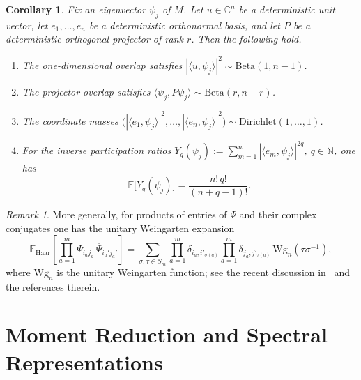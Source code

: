 \documentclass[11pt,a4paper]{article}
\newtheorem{corollary}[theorem]{Corollary}
\theoremstyle{definition}\newtheorem{definition}[theorem]{Definition}
\theoremstyle{remark}\newtheorem{remark}[theorem]{Remark}
\numberwithin{equation}{section}
\newcommand{\C}{\mathbb{C}}
\newcommand{\EE}{\mathbb{E}}
\begin{document}
\begin{corollary} 
Fix an
eigenvector $\psi_j$ of $M$. Let $u\in\C^n$ be a deterministic unit vector, let
$e_1,\dots,e_n$ be a deterministic orthonormal basis, and let $P$ be a
deterministic orthogonal projector of rank $r$. Then the following hold.

\begin{enumerate}
\item The one-dimensional overlap satisfies $|\langle u,\psi_j\rangle|^2 \sim \mathrm{Beta}(1,n-1)$.

\item The projector overlap satisfies $\langle \psi_j,P\psi_j\rangle \sim \mathrm{Beta}(r,n-r)$.

\item The coordinate masses
$\bigl(|\langle e_1,\psi_j\rangle|^2,\dots,|\langle e_n,\psi_j\rangle|^2\bigr) 
\sim \mathrm{Dirichlet}(1,\dots,1)$.

\item For the inverse participation ratios $ Y_q(\psi_j):=\sum_{m=1}^n |\langle e_m,\psi_j\rangle|^{2q}$,
  $ q\in\mathbb N$, one has
\begin{equation}
\EE\big[Y_q(\psi_j)\big]
=
\frac{n!\,q!}{(n+q-1)!}.
\end{equation}
\end{enumerate}
\end{corollary}
 

\begin{remark} 
More generally, for products of entries of $\Psi$ and their complex conjugates one
has the unitary Weingarten expansion
\begin{equation}
\EE_{\mathrm{Haar}}\!\left[\prod_{a=1}^{m}\Psi_{i_a j_a}\,\overline{\Psi}_{i_a' j_a'}\right]
=
\sum_{\sigma,\tau\in S_m}
\prod_{a=1}^{m}\delta_{i_a,i'_{\sigma(a)}}
\prod_{a=1}^{m}\delta_{j_a,j'_{\tau(a)}}
\,\mathrm{Wg}_n(\tau\sigma^{-1}),
\end{equation}
where $\mathrm{Wg}_n$ is the unitary Weingarten function; see the recent discussion in~\cite{CollinsMatsumotoNovak2022} and the references therein.
\end{remark}

 
  
\section{Moment Reduction and Spectral Representations}
\label{sec:unitary_moments}
 
\end{document}
